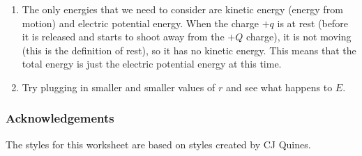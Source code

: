 \documentclass[12pt,paper=letter]{scrartcl}
\begin{document}
\begin{enumerate}[leftmargin=0pt, itemsep=1.4em]
        \item \label{hint:zero_kinetic_energy} The only energies that we need to consider are kinetic energy (energy from motion) and electric potential energy.
        When the charge $+q$ is at rest (before it is released and starts to shoot away from the $+Q$ charge),
        it is not moving (this is the definition of rest), so it has no kinetic energy.
        This means that the total energy is just the electric potential energy at this time.
        \item \label{hint:approximate_limit_electric_field} Try plugging in smaller and smaller values of $r$ and see what happens to $E$.
    \end{enumerate}
    
    
    \subsubsection*{Acknowledgements}
    The styles for this worksheet are based on styles created by CJ Quines.
\end{document}
